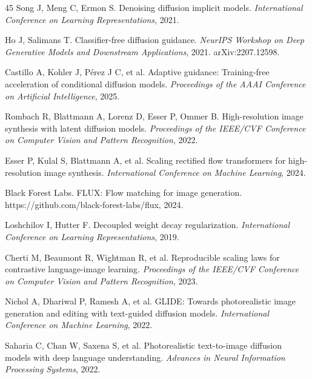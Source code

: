 \documentclass[times,twocolumn,final]{elsarticle}
\providecommand{\DIFdel}[1]{{\protect\color{red} \scriptsize #1}} %
\providecommand{\DIFdelbegin}{} %
\begin{document}
\begin{thebibliography}{45}
Song J, Meng C, Ermon S. Denoising diffusion implicit models. \textit{International Conference on Learning Representations}, 2021.

Ho J, Salimans T. Classifier-free diffusion guidance. \textit{NeurIPS Workshop on Deep Generative Models and Downstream Applications}, 2021. arXiv:2207.12598.

Castillo A, Kohler J, P\'erez J C, et al. Adaptive guidance: Training-free acceleration of conditional diffusion models. \textit{Proceedings of the AAAI Conference on Artificial Intelligence}, 2025.

\DIFdelbegin %
\DIFdel{Rombach R, Blattmann A, Lorenz D, Esser P, Ommer B. High-resolution image synthesis with latent diffusion models. \textit{Proceedings of the IEEE/CVF Conference on Computer Vision and Pattern Recognition}, 2022.
}%

\DIFdel{Esser P, Kulal S, Blattmann A, et al. Scaling rectified flow transformers for high-resolution image synthesis. \textit{International Conference on Machine Learning}, 2024.
}%

\DIFdel{Black Forest Labs. FLUX: Flow matching for image generation. https://github.com/black-forest-labs/flux, 2024.
}%

\DIFdel{Loshchilov I, Hutter F. Decoupled weight decay regularization. \textit{International Conference on Learning Representations}, 2019.
}%

\DIFdel{Cherti M, Beaumont R, Wightman R, et al. Reproducible scaling laws for contrastive language-image learning. \textit{Proceedings of the IEEE/CVF Conference on Computer Vision and Pattern Recognition}, 2023.
}%

\DIFdel{Nichol A, Dhariwal P, Ramesh A, et al. GLIDE: Towards photorealistic image generation and editing with text-guided diffusion models. \textit{International Conference on Machine Learning}, 2022.
}%

\DIFdel{Saharia C, Chan W, Saxena S, et al. Photorealistic text-to-image diffusion models with deep language understanding. \textit{Advances in Neural Information Processing Systems}, 2022.
}%


\end{thebibliography}
\end{document}
